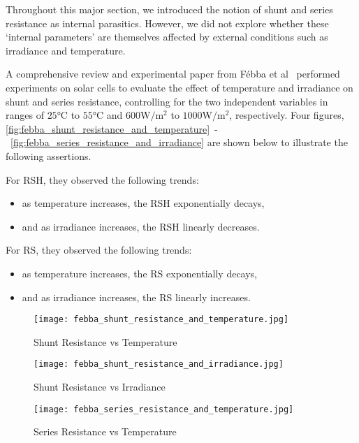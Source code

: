 Throughout this major section, we introduced the notion of shunt and series
resistance as internal parasitics. However, we did not explore whether these
`internal parameters' are themselves affected by external conditions such as
irradiance and temperature.

A comprehensive review and experimental paper from Fébba et
al~\cite{febba_et_al} performed experiments on solar cells to evaluate the
effect of temperature and irradiance on shunt and series resistance, controlling
for the two independent variables in ranges of $25\si{\celsius}$ to
$55\si{\celsius}$ and $600\si{\watt/\meter^2}$ to $1000\si{\watt/\meter^2}$,
respectively. Four figures,
\autoref{fig:febba_shunt_resistance_and_temperature}~-~\autoref{fig:febba_series_resistance_and_irradiance}
are shown below to illustrate the following assertions.

For \acf{RSH}, they observed the following trends:

\begin{itemize}
    \item as temperature increases, the \ac{RSH} exponentially decays,
    \item and as irradiance increases, the \ac{RSH} linearly decreases.
\end{itemize}

For \ac{RS}, they observed the following trends:

\begin{itemize}
    \item as temperature increases, the \ac{RS} exponentially decays,
    \item and as irradiance increases, the \ac{RS} linearly increases.
\end{itemize}

\begin{figure}[!htbp]
    \centering
    \texttt{[image: febba\_shunt\_resistance\_and\_temperature.jpg]}
    \caption{Shunt Resistance vs Temperature~\cite{febba_et_al}}
    \label{fig:febba_shunt_resistance_and_temperature}
\end{figure}

\begin{figure}[!htbp]
    \centering
    \texttt{[image: febba\_shunt\_resistance\_and\_irradiance.jpg]}
    \caption{Shunt Resistance vs Irradiance~\cite{febba_et_al}}
    \label{fig:febba_shunt_resistance_and_irradiance}
\end{figure}

\begin{figure}[!htbp]
    \centering
    \texttt{[image: febba\_series\_resistance\_and\_temperature.jpg]}
    \caption{Series Resistance vs Temperature~\cite{febba_et_al}}
    \label{fig:febba_series_resistance_and_temperature}
\end{figure}

